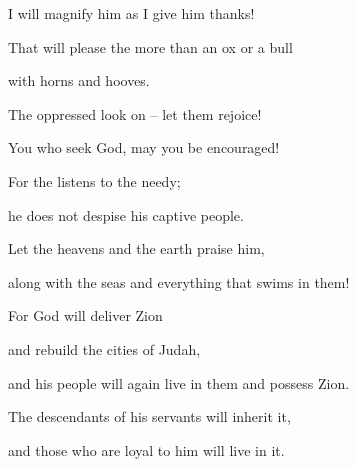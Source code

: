 {\par }{\Q I will magnify
him as I give him
thanks!
\par }{\Q {}That will please
the {}
more than an ox
or a bull
\par }{\Q with horns
and hooves.
\par }{\Q {}The oppressed
look on – let them rejoice!
\par }{\Q You who seek God, may you be encouraged!
\par }{\Q {}For
the {}
listens
to
the needy;
\par }{\Q he does not
despise
his captive people.
\par }{\Q {}Let the heavens
and the earth
praise
him,
\par }{\Q along with the seas
and everything
that swims in them!
\par }{\Q {}For
God
will deliver
Zion
\par }{\Q and rebuild
the cities
of Judah,
\par }{\Q and his people will again live
in them and possess Zion.
\par }{\Q {}The descendants
of his servants
will inherit
it,
\par }{\Q and those who are loyal
to him
will live in it.


\par }
